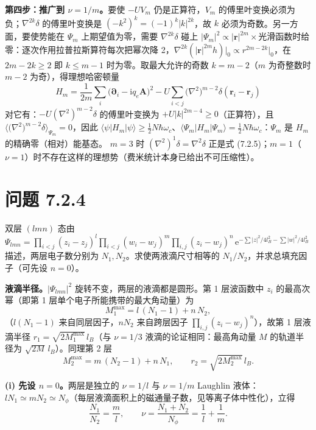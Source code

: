 \textbf{第四步：推广到 $\nu=1/m$。}要使 $-UV_m$ 仍是正算符，$V_m$ 的傅里叶变换必须为负；$\nabla^{2k}\delta$ 的傅里叶变换是 $(-k^2)^k=(-1)^k|k|^{2k}$，故 $k$ 必须为奇数。另一方面，要使势能在 $\Psi_m$ 上期望值为零，需要 $\nabla^{2k}\delta$ 碰上 $|\Psi_m|^2\propto|\pmb{r}|^{2m}\times$光滑函数时给零：逐次作用拉普拉斯算符每次把幂次降 2，$\nabla^{2k}(|\pmb{r}|^{2m}h)\big|_{0}\propto r^{2m-2k}|_{0}$，在 $2m-2k\geqslant2$ 即 $k\leqslant m-1$ 时为零。取最大允许的奇数 $k=m-2$（$m$ 为奇整数时 $m-2$ 为奇），得理想哈密顿量
\begin{equation*}
\boxed{\;H_m=\frac{1}{2m}\sum_i\big(\pmb{\partial}_i-\mathrm{i}q_e\pmb{A}\big)^2
-U\sum_{i<j}\big(\nabla^2\big)^{m-2}\delta(\pmb{r}_i-\pmb{r}_j)\;}
\end{equation*}
对它有：$-U(\nabla^2)^{m-2}\delta$ 的傅里叶变换为 $+U|k|^{2m-4}\geqslant0$（正算符），且 $\big\langle\big(\nabla^2\big)^{m-2}\delta\big\rangle_{\Psi_m}=0$，因此
$\langle\psi|H_m|\psi\rangle\geqslant\tfrac12N\hbar\omega_c$、$\langle\Psi_m|H_m|\Psi_m\rangle=\tfrac12N\hbar\omega_c$：$\Psi_m$ 是 $H_m$ 的精确零（相对）能基态。
$m=3$ 时 $(\nabla^2)^{1}\delta=\nabla^2\delta$ 正是式 (7.2.5)；$m=1$（$\nu=1$）时不存在这样的理想势（费米统计本身已给出不可压缩性）。

\section*{问题 7.2.4}
\begin{problem}
双层 $(lmn)$ 态由 $\Psi_{lmn}=\prod_{i<j}(z_i-z_j)^l\prod_{i<j}(w_i-w_j)^m\prod_{i,j}(z_i-w_j)^n\,\mathrm{e}^{-\sum|z|^2/4l_B^2-\sum|w|^2/4l_B^2}$ 描述，两层电子数分别为 $N_1,N_2$。求使两液滴尺寸相等的 $N_1/N_2$，并求总填充因子（可先设 $n=0$）。
\end{problem}
\solution
\textbf{液滴半径。}$|\Psi_{lmn}|^2$ 旋转不变，两层的液滴都是圆形。第 1 层波函数中 $z_i$ 的最高次幂（即第 1 层单个电子所能携带的最大角动量）为
\begin{equation*}
M_1^{\max}=l\,(N_1-1)+n\,N_2,
\end{equation*}
（$l(N_1-1)$ 来自同层因子，$nN_2$ 来自跨层因子 $\prod_{i,j}(z_i-w_j)^n$），故第 1 层液滴半径 $r_1=\sqrt{2M_1^{\max}}\,l_B$（与 $\nu=1/3$ 液滴的论证相同：最高角动量 $M$ 的轨道半径为 $\sqrt{2M}\,l_B$）。同理第 2 层
\begin{equation*}
M_2^{\max}=m\,(N_2-1)+n\,N_1,
\qquad r_2=\sqrt{2M_2^{\max}}\,l_B .
\end{equation*}

\textbf{(i) 先设 $n=0$。}两层是独立的 $\nu=1/l$ 与 $\nu=1/m$ Laughlin 液体：$lN_1\simeq mN_2\simeq N_\phi$（每层液滴面积上的磁通量子数，见等离子体中性化），立得
\begin{equation*}
\frac{N_1}{N_2}=\frac{m}{l},
\qquad
\nu=\frac{N_1+N_2}{N_\phi}=\frac1l+\frac1m .
\end{equation*}

